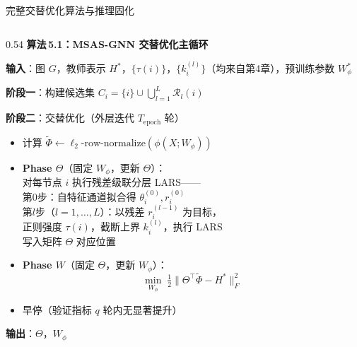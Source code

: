 \documentclass[aspectratio=169,9pt,xcolor=dvipsnames]{beamer}
\newcommand{\blue}[1]{\textcolor{mynavy}{#1}}
\begin{document}
\begin{frame}{完整交替优化算法与推理固化}
\begin{columns}[T]

\begin{column}{0.54\textwidth}
  \textbf{\blue{算法\,5.1：MSAS-GNN 交替优化主循环}}

  \vspace{0.05cm}
  \textbf{输入}：图 $G$，教师表示 $H^*$，$\{\tau(i)\}$，$\{k_i^{(l)}\}$（均来自第4章），预训练参数 $W_\phi^*$

  \smallskip
  \textbf{阶段一}：构建候选集 $C_i=\{i\}\cup\bigcup_{l=1}^{L}\mathcal{R}_l(i)$

  \smallskip
  \textbf{阶段二}：交替优化（外层迭代 $T_{\mathrm{epoch}}$ 轮）
  \begin{itemize}\setlength{\itemsep}{1pt}
    \item 计算 $\tilde{\Phi}\leftarrow\ell_2\text{-row-normalize}(\phi(X;W_\phi))$
    \item \textbf{Phase $\Theta$}（固定 $W_\phi$，更新 $\Theta$）：\\
      对每节点 $i$ 执行残差级联分层 LARS——\\
      \quad 第0步：自特征通道拟合得 $\theta_i^{(0)},r_i^{(0)}$\\
      \quad 第$l$步（$l=1,\ldots,L$）：以残差 $r_i^{(l-1)}$ 为目标，\\
      \quad\quad 正则强度 $\tau(i)$，截断上界 $k_i^{(l)}$，执行 LARS\\
      \quad 写入矩阵 $\Theta$ 对应位置
    \item \textbf{Phase $W$}（固定 $\Theta$，更新 $W_\phi$）：
      \begin{equation*}
        \min_{W_\phi}\;\tfrac{1}{2}\bigl\|\Theta^\top\tilde{\Phi}-H^*\bigr\|_F^2
      \end{equation*}
    \item 早停（验证指标 $q$ 轮内无显著提升）
  \end{itemize}

  \textbf{输出}：$\Theta$，$W_\phi$




\end{column}
\end{columns}
\end{frame}
\end{document}
